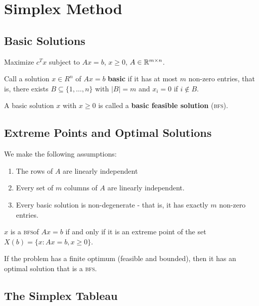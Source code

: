\chapter{Simplex Method}
\label{cha:simplex-method}

\section{Basic Solutions}
\label{sec:basic-solutions}

Maximize $c^{T}x$ subject to $Ax = b$, $x \geq 0$, $A \in \mathbb{R}^{m \times
n}$.

Call a solution $x \in R^{n}$ of $Ax = b$ \textbf{basic} if it has at
most $m$ non-zero entries, that is, there exists $B \subseteq \{1, \dots, n
\}$ with $|B| = m$ and $x_{i} = 0$ if $i \notin B$.

\newcommand{\bfs}{\textsc{bfs}{}}
A basic solution $x$ with $x \geq 0$ is called a \textbf{basic
  feasible solution} (\bfs).

\section{Extreme Points and Optimal Solutions}
\label{sec:extr-points-optim}

We make the following assumptions:

\begin{enumerate}
\item The rows of $A$ are linearly independent
\item Every set of $m$ columns of $A$ are linearly independent.
\item Every basic solution is non-degenerate - that is, it has exactly
  $m$ non-zero entries.
\end{enumerate}

\begin{thm}
  \label{defn:simplex_method:1}
  $x$ is a \bfs of $Ax = b$ if and only if it is an extreme point of
  the set  $X(b) = \{ x: Ax = b, x \geq 0 \}$.
\end{thm}

\begin{thm}
  \label{defn:simplex_method:2}
  If the problem has a finite optimum (feasible and bounded), then it has an optimal solution
  that is a \bfs.
\end{thm}


\section{The Simplex Tableau}
\label{sec:simplex-tableau}

